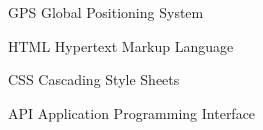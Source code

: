 \begin{siglas}
  \item[GPS] Global Positioning System
  \item[HTML] Hypertext Markup Language
  \item[CSS] Cascading Style Sheets
  \item[API] Application Programming Interface
\end{siglas}
